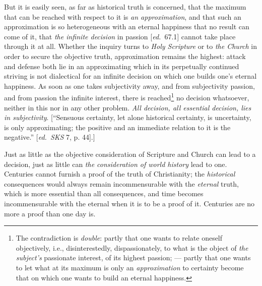 \documentclass[12pt,a4paper,openany]{book}
\newcommand{\ed}[1]{{\small[\textit{ed.}\ #1]}}
\begin{document}
But it is easily seen, as far as historical truth is concerned, that the
maximum that can be reached with respect to it is \emph{an approximation}, and
that such an approximation is so heterogeneous with an eternal happiness that no
result can come of it, that \emph{the infinite decision} in passion \ed{67.1}
cannot take place through it at all. Whether the inquiry turns to \emph{Holy
Scripture} or to \emph{the Church} in order to secure the objective truth,
approximation remains the highest: attack and defense both lie in an
approximating which in its perpetually continued striving is not dialectical for
an infinite decision on which one builds one's eternal happiness. As soon as
one takes subjectivity away, and from subjectivity passion, and from passion
the infinite interest, there is reached\footnote[37]{The contradiction is
\emph{double}: partly that one wants to relate oneself objectively, i.e.,
disinterestedly, dispassionately, to what is the object of \emph{the subject's}
passionate interest, of its highest passion; --- partly that one wants to let
what at its maximum is only an \emph{approximation} to certainty become that on
which one wants to build an eternal happiness.} no decision whatsoever, neither
in this nor in any other problem. \emph{All decision, all essential decision,
lies in subjectivity}. [``Sensuous certainty, let alone historical certainty, is
uncertainty, is only approximating; the positive and an immediate relation to it
is the negative.'' \ed{\emph{SKS} 7, p. 44}.]

Just as little as the objective consideration of Scripture and Church can lead
to a decision, just as little can \emph{the consideration of world history}
lead to one. Centuries cannot furnish a proof of the truth of Christianity; the
\emph{historical} consequences would always remain incommensurable with the
\emph{eternal} truth, which is more essential than all consequences, and time
becomes incommensurable with the eternal when it is to be a proof of it.
Centuries are no more a proof than one day is.
\end{document}

